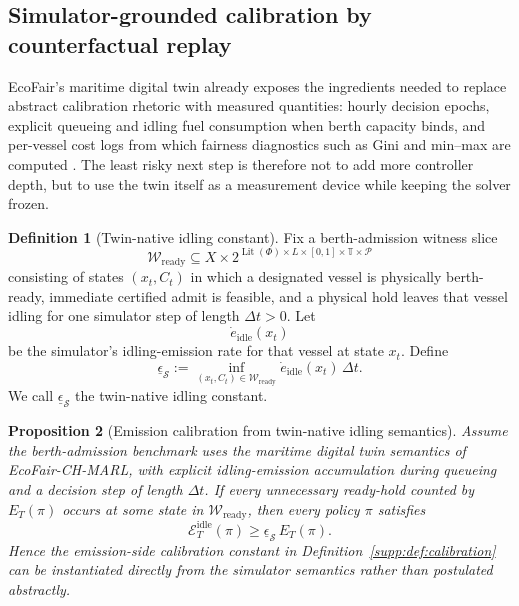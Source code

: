 \documentclass[11pt]{article}
\newcommand{\Lit}{\operatorname{Lit}}
\newcommand{\1}{\mathbf{1}}
\theoremstyle{definition}
\newtheorem{definition}{Definition}[section]
\theoremstyle{plain}
\newtheorem{proposition}[definition]{Proposition}
\theoremstyle{remark}
\begin{document}
\subsection{Simulator-grounded calibration by counterfactual replay}
\label{supp:subsec:sim-grounded-calibration}

EcoFair's maritime digital twin already exposes the ingredients needed to replace abstract calibration rhetoric with measured quantities: hourly decision epochs, explicit queueing and idling fuel consumption when berth capacity binds, and per-vessel cost logs from which fairness diagnostics such as Gini and min--max are computed \citep{Alqithami2026EcoFair}. The least risky next step is therefore not to add more controller depth, but to use the twin itself as a measurement device while keeping the solver frozen.

\begin{definition}[Twin-native idling constant]
\label{supp:def:twin-idling-constant}
Fix a berth-admission witness slice
\[
\mathcal W_{\mathrm{ready}} \subseteq X \times 2^{\Lit(\Phi)\times L\times [0,1]\times \mathbb T\times\mathcal P}
\]
consisting of states $(x_t,C_t)$ in which a designated vessel is physically berth-ready, immediate certified admit is feasible, and a physical hold leaves that vessel idling for one simulator step of length $\Delta t>0$. Let
\[
\dot e_{\mathrm{idle}}(x_t)
\]
be the simulator's idling-emission rate for that vessel at state $x_t$. Define
\[
\underline\epsilon_{\mathcal S}
:=
\inf_{(x_t,C_t)\in \mathcal W_{\mathrm{ready}}}
\dot e_{\mathrm{idle}}(x_t)\,\Delta t.
\]
We call $\underline\epsilon_{\mathcal S}$ the twin-native idling constant.
\end{definition}

\begin{proposition}[Emission calibration from twin-native idling semantics]
\label{supp:prop:twin-emission-calibration}
Assume the berth-admission benchmark uses the maritime digital twin semantics of EcoFair-CH-MARL, with explicit idling-emission accumulation during queueing and a decision step of length $\Delta t$. If every unnecessary ready-hold counted by $E_T(\pi)$ occurs at some state in $\mathcal W_{\mathrm{ready}}$, then every policy $\pi$ satisfies
\[
\mathcal E_T^{\mathrm{idle}}(\pi)
\ge
\underline\epsilon_{\mathcal S}\,E_T(\pi).
\]
Hence the emission-side calibration constant in Definition~\ref{supp:def:calibration} can be instantiated directly from the simulator semantics rather than postulated abstractly.
\end{proposition}
\end{document}
